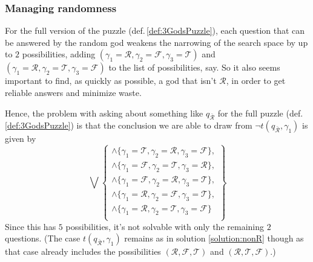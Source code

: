 \documentclass[twoside,twocolumn,a4paper,11pt]{article}
\theoremstyle{definition}
\begin{document}
\subsubsection{Managing randomness}

For the full
version of the puzzle (def.\,\ref{def:3GodsPuzzle}),
each question that can be answered by the random god weakens the 
narrowing of the search space by up to $2$ possibilities,
adding $(\gamma_1\!=\!\mathcal{R},\gamma_2\!=\!\mathcal{F},\gamma_3\!=\!\mathcal{T})$
and $(\gamma_1\!=\!\mathcal{R},\gamma_2\!=\!\mathcal{T},\gamma_3\!=\!\mathcal{F})$ 
to the list of possibilities, say.
So it also seems important to find, as quickly as possible,
a god that isn't $\mathcal{R}$, in order to get reliable answers and minimize waste.


Hence, the problem with asking about something like $q_{\bar{\mathcal{R}}}$ for the full
puzzle (def.\,\ref{def:3GodsPuzzle})
is that the conclusion we are able to draw from $\neg t(q_{\bar{\mathcal{R}}},\gamma_1)$
is given by
\[
\bigvee
 \left\lbrace
  \begin{matrix}
   \land\{\gamma_1=\mathcal{T},\gamma_2=\mathcal{R},\gamma_3=\mathcal{F}\},\\
   \land\{\gamma_1=\mathcal{F},\gamma_2=\mathcal{T},\gamma_3=\mathcal{R}\},\\
   \land\{\gamma_1=\mathcal{F},\gamma_2=\mathcal{R},\gamma_3=\mathcal{T}\},\\
   \land\{\gamma_1=\mathcal{R},\gamma_2=\mathcal{F},\gamma_3=\mathcal{T}\},\\
   \land\{\gamma_1=\mathcal{R},\gamma_2=\mathcal{T},\gamma_3=\mathcal{F}\}\;\\
  \end{matrix}
 \right\rbrace 
\]
Since this has $5$ possibilities, it's not solvable with only the remaining $2$ questions.
(The case $t(q_{\bar{\mathcal{R}}},\gamma_1)$ remains as in solution \ref{solution:nonR} though
as that case already includes the possibilities
$(\mathcal{R},\mathcal{F},\mathcal{T})$ and $(\mathcal{R},\mathcal{T},\mathcal{F})$.)
\end{document}
